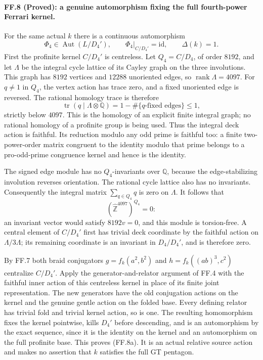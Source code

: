 \paragraph{FF.8 (Proved): a genuine automorphism fixing the full fourth-power Ferrari kernel.}
For the same actual $k$ there is a continuous automorphism
\[
 \boxed{\quad \Phi_4\in\operatorname{Aut}(L/D_4'),
        \qquad \Phi_4|_{C/D_4'}=\mathrm{id},
        \qquad\Delta(k)=1.\quad}
 \tag{FF.8a}
\]
First the profinite kernel $C/D_4'$ is centreless. Let
$Q_4=C/D_4$, of order $8192$, and let $\Lambda$ be the
integral cycle lattice of its Cayley graph on the three
involutions. This graph has $8192$ vertices and $12288$
unoriented edges, so $\operatorname{rank}\Lambda=4097$.
For $q\ne1$ in $Q_4$, the vertex action has trace zero,
and a fixed unoriented edge is reversed. The rational
homology trace is therefore
\[
         \operatorname{tr}(q\mid\Lambda\otimes\mathbb Q)
                     =1-\#\{q\text{-fixed edges}\}\leq1,
\]
strictly below $4097$. This is the homology of an explicit
finite integral graph; no rational homology of a profinite
group is being used. Thus the integral deck action is
faithful. Its reduction modulo any odd prime is faithful
too: a finite two-power-order matrix congruent to the
identity modulo that prime belongs to a pro-odd-prime
congruence kernel and hence is the identity.

The signed edge module has no $Q_4$-invariants over
$\mathbb Q$, because the edge-stabilizing involution
reverses orientation. The rational cycle lattice also
has no invariants. Consequently the integral matrix
$\sum_{q\in Q_4}q$ is zero on $\Lambda$. It follows that
\[
                 (\widehat{\mathbb Z}^{4097})^{Q_4}=0:
\]
an invariant vector would satisfy $8192v=0$, and this
module is torsion-free. A central element of $C/D_4'$
first has trivial deck coordinate by the faithful action
on $\Lambda/3\Lambda$; its remaining coordinate is an
invariant in $D_4/D_4'$, and is therefore zero.

By FF.7 both braid conjugators
$g=f_k(a^2,b^2)$ and $h=f_k((ab)^3,c^2)$ centralize
$C/D_4'$. Apply the generator-and-relator argument of
FF.4 with the faithful inner action of this centreless
kernel in place of its finite joint representation.
The new generators have the old conjugation actions
on the kernel and the genuine gentle action on the
folded base. Every defining relator has trivial fold
and trivial kernel action, so is one. The resulting
homomorphism fixes the kernel pointwise, kills $D_4'$
before descending, and is an automorphism by the exact
sequence, since it is the identity on the kernel and
an automorphism on the full profinite base. This proves
(FF.8a). It is an actual relative source action and makes
no assertion that $k$ satisfies the full GT pentagon.
